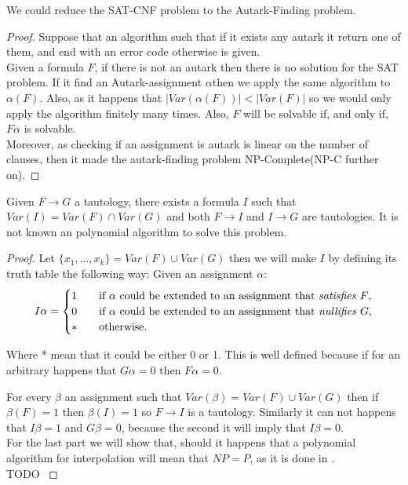 \begin{proposition} We could reduce the SAT-CNF problem to the Autark-Finding problem.
\begin{proof} Suppose that an algorithm such that if it exists any autark it return one of them, and end with an error code otherwise is given.  \\

Given a formula $F$, if there is not an autark then there is no solution for the SAT problem. If it find an Autark-assignment $\alpha$then we apply the same algorithm to $\alpha(F)$. Also, as it happens that $|Var(\alpha(F))|<|Var(F)|$ so we would only apply the algorithm finitely many times. Also, $F$ will be solvable if, and only if, $F\alpha$ is solvable.	\\

Moreover, as checking if an assignment is autark is linear on the number of clauses, then it made the autark-finding problem NP-Complete(NP-C further on).
\end{proof}
	
\end{proposition}



\begin{proposition}
	Given $F \to G$ a tautology, there exists a formula $I$ such that $Var(I) = Var(F)\cap Var(G)$ and both $F\to I$ and $I \to G$ are tautologies. It is not known an polynomial algorithm to solve this problem. 
\end{proposition}

\begin{proof} Let $\{x_1,...,x_k\} = Var(F)\cup Var(G)$ then we will make $I$ by defining its truth table the following way: Given an assignment $\alpha$:
\[   
I\alpha = 
     \begin{cases}
       1&\quad\text{if $\alpha$ could be extended to an assignment that \emph{satisfies} $F$}, \\
       0&\quad\text{if $\alpha$ could be extended to an assignment that \emph{nullifies} $G$},\\
     * &\quad\text{otherwise.} \\ 
     \end{cases}
\]

Where * mean that it could be either 0 or 1.  This is well defined because if for an arbitrary happens that $G\alpha = 0$ then $F\alpha = 0$.

For every $\beta$ an assignment such that $Var(\beta) = Var(F)\cup Var(G)$ then if $\beta(F) = 1$ then $\beta(I) = 1$ so $F \to I$  is a tautology. Similarly it can not happens that $I\beta = 1 $ and $G\beta = 0$, because the second it will imply that   $I\beta = 0$.\\

For the last part we will show that, should it happens that a polynomial algorithm for interpolation will mean that $NP = P$, as it is done in \cite{schoning2013satisfiability}.\\


{\color{red} TODO }
\end{proof}



